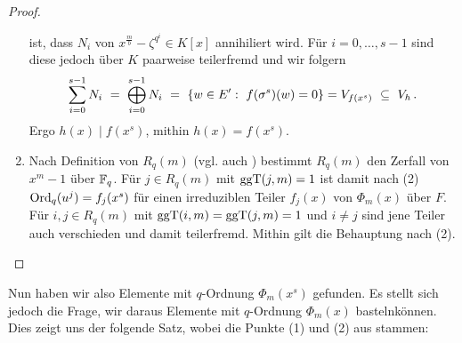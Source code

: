 \begin{proof}
\begin{enumerate}
      ist, dass $N_i$ von $x^{\frac m b}-\zeta^{q^i} \in K[x]$ annihiliert wird.
      Für $i=0,\ldots,s-1$ sind diese jedoch über $K$ paarweise teilerfremd
      und wir folgern
      \[ \sum_{i=0}^{s-1} N_i \ =\  \bigoplus_{i=0}^{s-1} N_i 
        \ =\  \{ w \in E':\ f(\sigma^s)(w) = 0 \} = V_{f(x^s)} 
        \ \subseteq\  V_h\,.\]
      Ergo $h(x) \mid f(x^s)$, mithin $h(x) = f(x^s)$.
    \item Nach Definition von $R_q(m)$ (vgl. auch 
      ) bestimmt $R_q(m)$ den Zerfall
      von $x^m-1$ über $\mathbb{F}_q$. Für $j\in R_q(m)$ mit $\operatorname{ggT}(j,m) = 1$ 
      ist damit nach (2) $\operatorname{Ord}_q(u^j) = f_j(x^s)$ für einen irreduziblen Teiler
      $f_j(x)$ von $\Phi_m(x)$ über $F$. Für $i,j\in R_q(m)$ mit 
      $\operatorname{ggT}(i,m) = \operatorname{ggT}(j,m) = 1$ und $i\neq j$ sind jene Teiler auch
      verschieden und damit teilerfremd. Mithin gilt die Behauptung
      nach  (2).
  \end{enumerate}
\end{proof}

Nun haben wir also Elemente mit $q$-Ordnung $\Phi_m(x^s)$ gefunden. Es stellt
sich jedoch die Frage, wir daraus Elemente mit $q$-Ordnung $\Phi_m(x)$ 
\glqq basteln\grqq können. Dies zeigt uns der folgende Satz, wobei 
die Punkte (1) und (2) aus 
\autocite[Satz 9.4]{hachenberger2013vorlesung} stammen:

